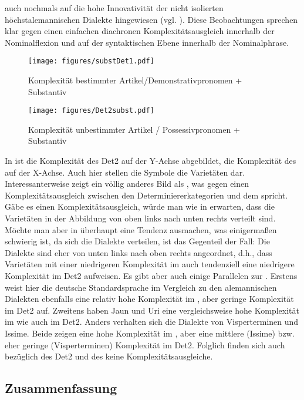 auch nochmals auf die hohe Innovativität der nicht isolierten höchstalemannischen Dialekte hingewiesen (vgl. ). Diese Beobachtungen sprechen klar gegen einen einfachen diachronen Komplexitätsausgleich innerhalb der Nominalflexion und auf der syntaktischen Ebene innerhalb der Nominalphrase.

\begin{figure}
	\texttt{[image: figures/substDet1.pdf]}
    \caption{Komplexität bestimmter Artikel/Demonstrativpronomen + Substantiv}\label{fig:1}
\end{figure}

\begin{figure}
	\texttt{[image: figures/Det2subst.pdf]}
    \caption{Komplexität unbestimmter Artikel / Possessivpronomen + Substantiv}\label{fig:2}
\end{figure}

In  ist die Komplexität des Det2 auf der Y-Achse abgebildet, die Komplexität des  auf der X-Achse. Auch hier stellen die Symbole die Varietäten dar. Interessanterweise zeigt  ein völlig anderes Bild als , was gegen einen Komplexitätsausgleich zwischen den Determiniererkategorien und dem  spricht. Gäbe es einen Komplexitätsausgleich, würde man wie in  erwarten, dass die Varietäten in der Abbildung von oben links nach unten rechts verteilt sind. Möchte man aber in  überhaupt eine Tendenz ausmachen, was einigermaßen schwierig ist, da sich die Dialekte verteilen, ist das Gegenteil der Fall: Die Dialekte sind eher von unten links nach oben rechts angeordnet, d.h., dass Varietäten mit einer niedrigeren Komplexität im  auch tendenziell eine niedrigere Komplexität im Det2 aufweisen. Es gibt aber auch einige Parallelen zur . Erstens weist hier die deutsche Standardsprache im Vergleich zu den alemannischen Dialekten ebenfalls eine relativ hohe Komplexität im , aber geringe Komplexität im Det2 auf. Zweitens haben Jaun und Uri eine vergleichsweise hohe Komplexität im  wie auch im Det2. Anders verhalten sich die Dialekte von Visperterminen und Issime. Beide zeigen eine hohe Komplexität im , aber eine mittlere (Issime) bzw. eher geringe (Visperterminen) Komplexität im Det2. Folglich finden sich auch bezüglich des Det2 und des  keine Komplexitätsausgleiche.

\subsection{Zusammenfassung}\label{6.1.4}

